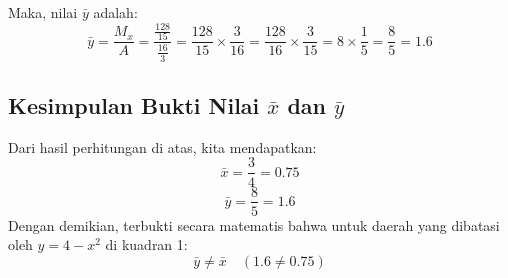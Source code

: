 \documentclass[12pt,a4paper]{article}
\begin{document}
Maka, nilai $\bar{y}$ adalah:
\[ \bar{y} = \frac{M_x}{A} = \frac{\frac{128}{15}}{\frac{16}{3}} = \frac{128}{15} \times \frac{3}{16} = \frac{128}{16} \times \frac{3}{15} = 8 \times \frac{1}{5} = \frac{8}{5} = 1.6 \]

\subsection*{Kesimpulan Bukti Nilai $\bar{x}$ dan $\bar{y}$}
Dari hasil perhitungan di atas, kita mendapatkan:
\[ \bar{x} = \frac{3}{4} = 0.75 \]
\[ \bar{y} = \frac{8}{5} = 1.6 \]
Dengan demikian, terbukti secara matematis bahwa untuk daerah yang dibatasi oleh $y = 4 - x^2$ di kuadran 1:
\[ \bar{y} \neq \bar{x} \quad \left(1.6 \neq 0.75\right) \]
\end{document}
